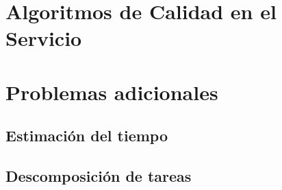 \section{Algoritmos de Calidad en el Servicio}

\section{Problemas adicionales}

\subsection{Estimación del tiempo}
\subsection{Descomposición de tareas}
